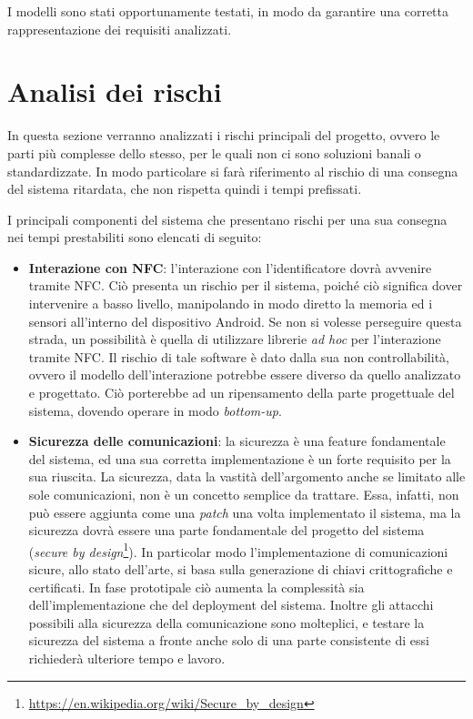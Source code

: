 \documentclass[a4paper,12pt]{report}
\begin{document}
I modelli sono stati opportunamente testati, in modo da garantire una corretta rappresentazione dei requisiti analizzati.

\section{Analisi dei rischi}
In questa sezione verranno analizzati i rischi principali del progetto, ovvero le parti più complesse dello stesso, per le quali non ci sono soluzioni banali o standardizzate. In modo particolare si farà riferimento al rischio di una consegna del sistema ritardata, che non rispetta quindi i tempi prefissati. 

I principali componenti del sistema che presentano rischi per una sua consegna nei tempi prestabiliti sono elencati di seguito: 
\begin{itemize}
	\item \textbf{Interazione con NFC}: l'interazione con l'identificatore dovrà avvenire tramite NFC. Ciò presenta un rischio per il sistema, poiché ciò significa dover intervenire a basso livello, manipolando in modo diretto la memoria ed i sensori all'interno del dispositivo Android. Se non si volesse perseguire questa strada, un possibilità è quella di utilizzare librerie \emph{ad hoc} per l'interazione tramite NFC. Il rischio di tale software è dato dalla sua non controllabilità, ovvero il modello dell'interazione potrebbe essere diverso da quello analizzato e progettato. Ciò porterebbe ad un ripensamento della parte progettuale del sistema, dovendo operare in modo \emph{bottom-up}.
	\item \textbf{Sicurezza delle comunicazioni}: la sicurezza è una feature fondamentale del sistema, ed una sua corretta implementazione è un forte requisito per la sua riuscita. La sicurezza, data la vastità dell'argomento anche se limitato alle sole comunicazioni, non è un concetto semplice da trattare. Essa, infatti, non può essere aggiunta come una \emph{patch} una volta implementato il sistema, ma la sicurezza dovrà essere una parte fondamentale del progetto del sistema (\emph{secure by design}\footnote{\url{https://en.wikipedia.org/wiki/Secure_by_design}}). In particolar modo l'implementazione di comunicazioni sicure, allo stato dell'arte, si basa sulla generazione di chiavi crittografiche e certificati. In fase prototipale ciò aumenta la complessità sia dell'implementazione che del deployment del sistema. Inoltre gli attacchi possibili alla sicurezza della comunicazione sono molteplici, e testare la sicurezza del sistema a fronte anche solo di una parte consistente di essi richiederà ulteriore tempo e lavoro.

\end{itemize}
\end{document}

